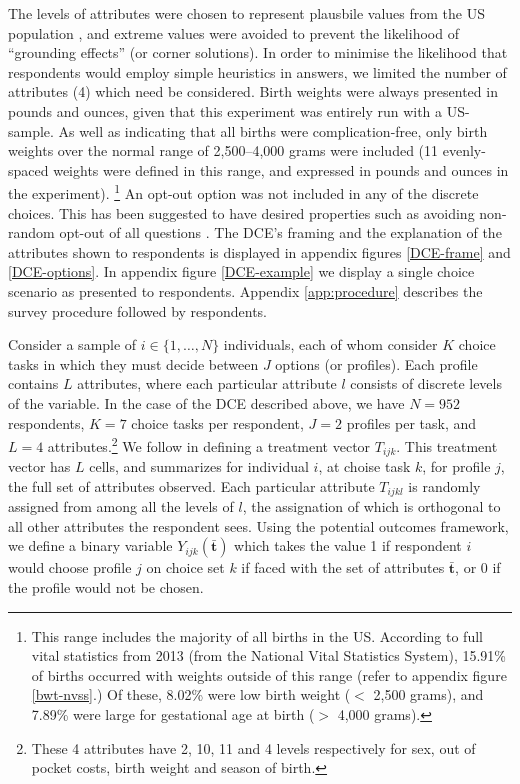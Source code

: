 \documentclass[a4paper, 11pt]{article}
\begin{document}
\begin{spacing}{1.4}
The levels of attributes were chosen to represent plausbile values from the
US population \citep{RyanFarrar2000}, and extreme values were avoided to
prevent the likelihood of ``grounding effects'' (or corner solutions).  In
order to minimise the likelihood that respondents would employ simple
heuristics in answers, we limited the number of attributes (4) which need be
considered.  Birth weights were always presented in pounds and ounces, given
that this experiment was entirely run with a US-sample.  As well as indicating
that all births were complication-free, only birth weights over the normal
range of 2,500--4,000 grams were included (11 evenly-spaced weights were
defined in this range, and expressed in pounds and ounces in the experiment).%
\footnote{This range includes the majority of all births in the US.  According
  to full vital statistics from
  2013 (from the National Vital Statistics System), 15.91\% of births occurred
  with weights outside of this range (refer to appendix figure \ref{bwt-nvss}.)
  Of these, 8.02\% were low birth weight ($<$ 2,500 grams), and 7.89\% were
  large for gestational age at birth ($>$ 4,000 grams).
} 
An opt-out option was not included in any of the discrete choices.  This
has been suggested to have desired properties such as avoiding non-random
opt-out of all questions \citep{Veldwijketal2014,BekkerGrobetal2012}.  The
DCE's framing and the explanation of the attributes shown to respondents is
displayed in appendix figures \ref{DCE-frame} and \ref{DCE-options}.  In
appendix figure \ref{DCE-example} we display a single choice scenario as
presented to respondents.  Appendix \ref{app:procedure} describes the
survey procedure followed by respondents.

Consider a sample of $i\in \{1,\ldots,N\}$ individuals, each of whom consider
$K$ choice tasks in which they must decide between $J$ options (or profiles).
Each profile contains $L$ attributes, where each particular attribute $l$
consists of discrete levels of the variable.  In the case of the DCE
described above, we have $N=952$ respondents, $K=7$ choice tasks per
respondent, $J=2$ profiles per task, and $L=4$ attributes.\footnote{These
  4 attributes have 2, 10, 11 and 4 levels respectively for sex, out of pocket
  costs, birth weight and season of birth.} We follow
\citet{Hainmuelleretal2013} in defining a treatment vector $T_{ijk}$.
This treatment vector has $L$ cells, and summarizes for individual $i$,
at choise task $k$, for profile $j$, the full set of attributes observed.
Each particular attribute $T_{ijkl}$ is randomly assigned from among all
the levels of $l$, the assignation of which is orthogonal to all other
attributes the respondent sees.  Using the potential outcomes framework,
we define a binary variable $Y_{ijk}(\bar{\mathbf{t}})$ which takes the
value 1 if respondent $i$ would choose profile $j$ on choice set $k$ if
faced with the set of attributes $\bar{\mathbf{t}}$, or 0 if the profile
would not be chosen.


\end{spacing}
\end{document}

